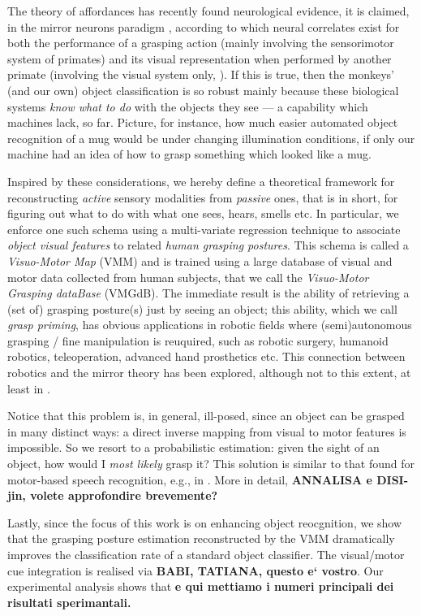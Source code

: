 The theory of affordances has recently found neurological evidence,
it is claimed, in the mirror neurons paradigm \cite{gallese-96,rizzolatti-04}, according to which
neural correlates exist for both the performance of a grasping
action (mainly involving the sensorimotor system of primates) and its visual
representation when performed by another primate (involving the visual system only,
\cite{umilta-01}). If this is true, then the monkeys' (and our own) object classification is
so robust mainly because these biological systems \emph{know what to do} with the
objects they see --- a capability which machines lack, so far. Picture, for instance,
how much easier automated object recognition of a mug would be under changing illumination
conditions, if only our machine had an idea of how to grasp something which looked like
a mug.

Inspired by these considerations, we hereby define a theoretical framework for
reconstructing \emph{active} sensory modalities from \emph{passive} ones, that is in
short, for figuring out what to do with what one sees, hears, smells etc. In particular,
we enforce one such schema using a multi-variate regression technique to associate
\emph{object visual features} to related \emph{human grasping postures}. This schema is
called a \emph{Visuo-Motor Map} (VMM) and is trained
using a large database of visual and motor data collected from human subjects, that
we call the \emph{Visuo-Motor Grasping dataBase} (VMGdB). The immediate result is the
ability of retrieving a (set of) grasping posture(s) just by seeing an object; this
ability, which we call \emph{grasp priming}, has obvious applications in robotic fields
where (semi)autonomous grasping / fine manipulation is reuquired, such as robotic surgery,
humanoid robotics, teleoperation, advanced hand prosthetics etc. This connection between
robotics and the mirror theory has been explored, although not to this extent, at
least in \cite{lopes-05,metta-06}.

Notice that this problem is, in general, ill-posed, since an object can be grasped in
many distinct ways: a direct inverse mapping from visual to motor features is impossible.
So we resort to a probabilistic estimation: given the sight of an object, how would I
\emph{most likely} grasp it? This solution is similar to that found for motor-based speech
recognition, e.g., in \cite{richmond2007}. More in detail, \textbf{ANNALISA e DISI-jin, volete
approfondire brevemente?}

Lastly, since the focus of this work is on enhancing object reocgnition, we show
that the grasping posture estimation reconstructed by the VMM dramatically improves the
classification rate of a standard object classifier. The visual/motor cue integration is
realised via \textbf{BABI, TATIANA, questo e` vostro}. Our experimental analysis shows
that \textbf{e qui mettiamo i numeri principali dei risultati sperimantali.}

